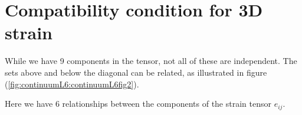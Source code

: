 \section{Compatibility condition for 3D strain}

While we have 9 components in the tensor, not all of these are independent.  The sets above and below the diagonal can be related, as illustrated in figure (\ref{fig:continuumL6:continuumL6fig2}).


Here we have 6 relationships between the components of the strain tensor $e_{ij}$.

